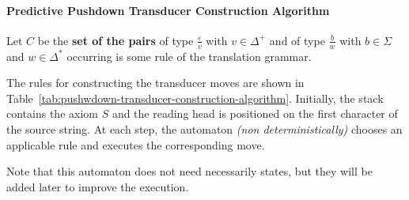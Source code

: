 \documentclass[english]{article}
\begin{document}
\paragraph{Predictive Pushdown Transducer Construction Algorithm}
\label{par:predictive-pushdown-tansducer-construction-algorithm}

Let \(C\) be the \textbf{set of the pairs} of type \(\frac{\varepsilon}{v}\) with \(v \in \Delta^+\) and of type \(\frac{b}{w}\) with \(b \in \Sigma\) and \(w \in \Delta^\ast\) occurring is some rule of the translation grammar.

The rules for constructing the transducer moves are shown in Table~\ref{tab:pushwdown-transducer-construction-algorithm}.
Initially, the stack contains the axiom \(S\) and the reading head is positioned on the first character of the source string.
At each step, the automaton \textit{(non deterministically)} chooses an applicable rule and executes the corresponding move.

Note that this automaton does not need necessarily states, but they will be added later to improve the execution.
\end{document}
